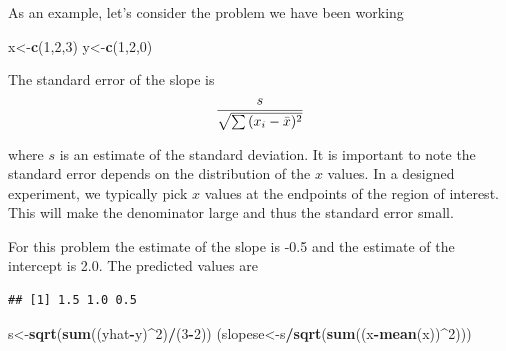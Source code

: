 \documentclass[]{book}
\newenvironment{Shaded}{\begin{snugshade}}{\end{snugshade}}
\newcommand{\KeywordTok}[1]{\textcolor[rgb]{0.13,0.29,0.53}{\textbf{#1}}}
\newcommand{\DecValTok}[1]{\textcolor[rgb]{0.00,0.00,0.81}{#1}}
\newcommand{\FloatTok}[1]{\textcolor[rgb]{0.00,0.00,0.81}{#1}}
\newcommand{\OperatorTok}[1]{\textcolor[rgb]{0.81,0.36,0.00}{\textbf{#1}}}
\newcommand{\NormalTok}[1]{#1}
\theoremstyle{definition}
\theoremstyle{definition}
\theoremstyle{definition}
\theoremstyle{remark}
\begin{document}
As an example, let's consider the problem we have been working

\begin{Shaded}
\begin{Highlighting}[]
\NormalTok{x<-}\KeywordTok{c}\NormalTok{(}\DecValTok{1}\NormalTok{,}\DecValTok{2}\NormalTok{,}\DecValTok{3}\NormalTok{)}
\NormalTok{y<-}\KeywordTok{c}\NormalTok{(}\DecValTok{1}\NormalTok{,}\DecValTok{2}\NormalTok{,}\DecValTok{0}\NormalTok{)}
\end{Highlighting}
\end{Shaded}

The standard error of the slope is
\[{s \over \sqrt{\sum{(x_{i}-\bar{x})^{2}}}}\]

where \(s\) is an estimate of the standard deviation. It is important to
note the standard error depends on the distribution of the \(x\) values.
In a designed experiment, we typically pick \(x\) values at the
endpoints of the region of interest. This will make the denominator
large and thus the standard error small.

For this problem the estimate of the slope is -0.5 and the estimate of
the intercept is 2.0. The predicted values are

\begin{Shaded}
\end{Shaded}

\begin{verbatim}
## [1] 1.5 1.0 0.5
\end{verbatim}

\begin{Shaded}
\begin{Highlighting}[]
\NormalTok{s<-}\KeywordTok{sqrt}\NormalTok{(}\KeywordTok{sum}\NormalTok{((yhat}\OperatorTok{-}\NormalTok{y)}\OperatorTok{^}\DecValTok{2}\NormalTok{)}\OperatorTok{/}\NormalTok{(}\DecValTok{3}\OperatorTok{-}\DecValTok{2}\NormalTok{))}
\NormalTok{(slopese<-s}\OperatorTok{/}\KeywordTok{sqrt}\NormalTok{(}\KeywordTok{sum}\NormalTok{((x}\OperatorTok{-}\KeywordTok{mean}\NormalTok{(x))}\OperatorTok{^}\DecValTok{2}\NormalTok{)))}
\end{Highlighting}
\end{Shaded}
\end{document}
